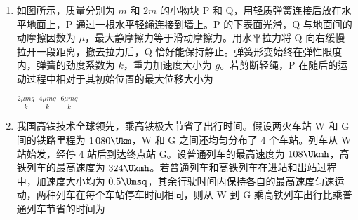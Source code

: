 \documentclass[\gkver]{gaokaozhenti}
\begin{document}
\begin{enumerate}

{$2q$，$r$}
{$2q$，$2r$}
{$4q$，$2r$}


\item
如图所示，质量分别为 $m$ 和 $2m$ 的小物块 P 和 Q，用轻质弹簧连接后放在水平地面上，P 通过一根水平轻绳连接到墙上。P 的下表面光滑，Q 与地面间的动摩擦因数为 $\mu$，最大静摩擦力等于滑动摩擦力。用水平拉力将 Q 向右缓慢拉开一段距离，撤去拉力后，Q 恰好能保持静止。弹簧形变始终在弹性限度内，弹簧的劲度系数为 $k$，重力加速度大小为 $g$。若剪断轻绳，P 在随后的运动过程中相对于其初始位置的最大位移大小为 


{$\frac{2\mu mg}{k}$}
{$\frac{4\mu mg}{k}$}
{$\frac{6\mu mg}{k}$}


\item
我国高铁技术全球领先，乘高铁极大节省了出行时间。假设两火车站 W 和 G 间的铁路里程为 $1\,080\Ukm$，W 和 G 之间还均匀分布了 4 个车站。列车从 W 站始发，经停 4 站后到达终点站 G。设普通列车的最高速度为 $108\Ukmh$，高铁列车的最高速度为 $324\Ukmh$。若普通列车和高铁列车在进站和出站过程中，加速度大小均为 $0.5\Umsq$，其余行驶时间内保持各自的最高速度匀速运动，两种列车在每个车站停车时间相同，则从 W 到 G 乘高铁列车出行比乘普通列车节省的时间为 


\end{enumerate}
\end{document}
